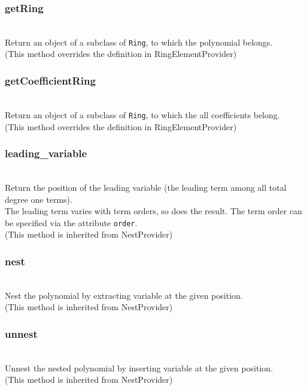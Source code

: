   \subsubsection{getRing}
  \\
  \spacing
  \quad Return an object of a subclass of {\tt Ring},
  to which the polynomial belongs.\\
  (This method overrides the definition in RingElementProvider)

  \subsubsection{getCoefficientRing}
  \\
  \spacing
  \quad Return an object of a subclass of {\tt Ring},
  to which the all coefficients belong.\\
  (This method overrides the definition in RingElementProvider)

  \subsubsection{leading\_variable}
  \\
  \spacing
  \quad Return the position of the leading variable
  (the leading term among all total degree one terms).\\
  The leading term varies with term orders, so does the result. The
  term order can be specified via the attribute {\tt order}.\\
  (This method is inherited from NestProvider)

  \subsubsection{nest}
  \\
  \spacing
  \quad Nest the polynomial by extracting  variable
  at the given position.\\
  (This method is inherited from NestProvider)

  \subsubsection{unnest}
  \\
  \spacing
  \quad Unnest the nested polynomial  by inserting 
  variable at the given position.\\
  (This method is inherited from NestProvider)

